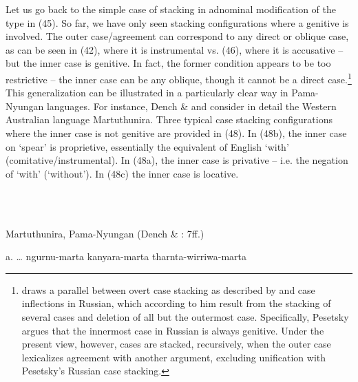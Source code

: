 \documentclass[output=paper]{langsci/langscibook}
\begin{document}
 
\begin{styleSfondomedioiColorexi}
Let us go back to the simple case of stacking in adnominal modification of the type in (45). So far, we have only seen stacking configurations where a genitive is involved. The outer case/agreement can correspond to any direct or oblique case, as can be seen in (42), where it is instrumental vs. (46), where it is accusative – but the inner case is genitive. In fact, the former condition appears to be too restrictive – the inner case can be any oblique, though it cannot be a direct case.\footnote{\citet{Pesetsky2013} draws a parallel between overt case stacking as described by \citet{Richards2013} and case inflections in Russian, which according to him result from the stacking of several cases and deletion of all but the outermost case. Specifically, Pesetsky argues that the innermost case in Russian is always genitive. Under the present view, however, cases are stacked, recursively, when the outer case lexicalizes agreement with another argument, excluding unification with Pesetsky’s Russian case stacking.}  This generalization can be illustrated in a particularly clear way in Pama-Nyungan languages. For instance, Dench \& \citet{Evans1988} and \citet{Dench1995} consider in detail the Western Australian language Martuthunira. Three typical case stacking configurations where the inner case is not genitive are provided in (48). In (48b), the inner case on ‘spear’ is proprietive, essentially the equivalent of English ‘with’ (comitative/instrumental). In (48a), the inner case is privative – i.e. the negation of ‘with’ (‘without’). In (48c) the inner case is locative. 
\end{styleSfondomedioiColorexi}

\begin{styleSfondomedioiColorexi}
\ea%
    \label{ex:key:48}
    \gll\\
        \\
    \glt
    \z

           Martuthunira, Pama-Nyungan (Dench \& \citealt{Evans1988}: 7ff.)
\end{styleSfondomedioiColorexi}

\begin{styleSfondomedioiColorexi}
a.  … ngurnu-marta   kanyara-marta  tharnta-wirriwa-marta    
\end{styleSfondomedioiColorexi}
\end{document}
